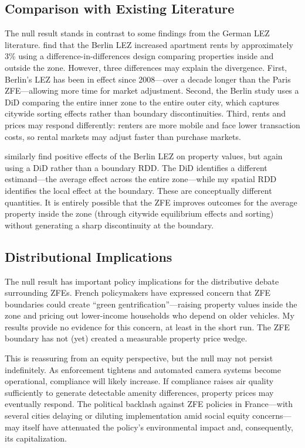 \documentclass[12pt]{article}
\begin{document}
\subsection{Comparison with Existing Literature}

The null result stands in contrast to some findings from the German LEZ literature. \citet{wolff2023low} find that the Berlin LEZ increased apartment rents by approximately 3\% using a difference-in-differences design comparing properties inside and outside the zone. However, three differences may explain the divergence. First, Berlin's LEZ has been in effect since 2008---over a decade longer than the Paris ZFE---allowing more time for market adjustment. Second, the Berlin study uses a DiD comparing the entire inner zone to the entire outer city, which captures citywide sorting effects rather than boundary discontinuities. Third, rents and prices may respond differently: renters are more mobile and face lower transaction costs, so rental markets may adjust faster than purchase markets.

\citet{aydin2023berlin} similarly find positive effects of the Berlin LEZ on property values, but again using a DiD rather than a boundary RDD. The DiD identifies a different estimand---the average effect across the entire zone---while my spatial RDD identifies the local effect at the boundary. These are conceptually different quantities. It is entirely possible that the ZFE improves outcomes for the average property inside the zone (through citywide equilibrium effects and sorting) without generating a sharp discontinuity at the boundary.

\subsection{Distributional Implications}

The null result has important policy implications for the distributive debate surrounding ZFEs. French policymakers have expressed concern that ZFE boundaries could create ``green gentrification''---raising property values inside the zone and pricing out lower-income households who depend on older vehicles. My results provide no evidence for this concern, at least in the short run. The ZFE boundary has not (yet) created a measurable property price wedge.

This is reassuring from an equity perspective, but the null may not persist indefinitely. As enforcement tightens and automated camera systems become operational, compliance will likely increase. If compliance raises air quality sufficiently to generate detectable amenity differences, property prices may eventually respond. The political backlash against ZFE policies in France---with several cities delaying or diluting implementation amid social equity concerns---may itself have attenuated the policy's environmental impact and, consequently, its capitalization.
\end{document}
